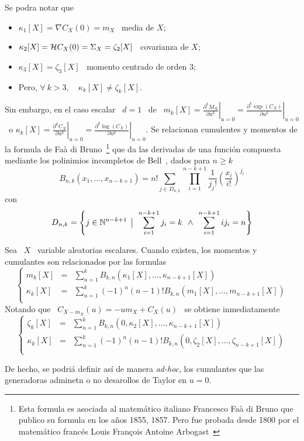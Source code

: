 {Se podra notar que
%
\begin{itemize}
\item $\kappa_1[X] = \nabla C_X(0) = m_X$ \ media de $X$;
%
\item $\kappa_2[X] = \mathcal{H} C_X(0) = \Sigma_X = \zeta_2[X]$ \ covarianza de $X$;
%
\item $\kappa_3[X] = \zeta_3[X]$ \ momento centrado de orden 3;
%
\item Pero, $\forall \: k > 3, \quad \kappa_k[X] \ne \zeta_k[X]$.
\end{itemize}

Sin embargo, en  el caso escalar \  $d=1$ \ de \ $m_k[X]  = \left. \frac{\partial^k
    M_X}{\partial     u^k}    \right|_{u=0}    =     \left.     \frac{\partial^k
    \exp(C_X)}{\partial   u^k}   \right|_{u=0}$   \   o   $\kappa_k[X]   =   \left.
  \frac{\partial^k C_X}{\partial  u^k} \right|_{u=0} =  \left.  \frac{\partial^k
    \log(C_X)}{\partial u^k} \right|_{u=0}$. Se relacionan cumulentes y momentos
de  la  formula  de  Fa\`a   di  Bruno~\footnote{Esta  formula  es  asociada  al
  matem\'atico italiano Francesco  Fa\`a di Bruno que publico  su formula en los
  a\~nos 1855, 1857.  Pero fue  probada desde 1800 por el matem\'atico franc\'es
  Louis Fran\c{c}ois Antoine Arbogast~\cite{Abo00}}  que da las derivadas de una
funci\'on compuesta~\cite{Faa55,  Faa57} mediante los  polinimios incompletos de
Bell~\cite{Bel27}, dados para $n \ge k$
%
\[
B_{n,k}(x_1,\ldots,x_{n-k+1})  = n!   \sum_{j  \in D_{n,k}}  \prod_{i=1}^{n-k+1}
\frac{1}{j_j!} \left( \frac{x_i}{i!} \right)^{j_i}
\]
%
con
%
\[
D_{n,k}  =  \left\{ j  \in  \mathbb{N}^{n-k+1} \:\: \big| \:\:  \sum_{i=1}^{n-k+1}  j_i  = k  \:\: \wedge \:\:
  \sum_{i=1}^{n-k+1} i j_i = n \right\}
\]

\begin{lema}
  Sea  \ $X$ \  variable aleatorias  escalares. Cuando  existen, los  momentos y
  cumulantes son relacionados por las formulas
%
\[\left\{\begin{array}{lll}
m_k[X] & = & \displaystyle \sum_{n=1}^k B_{k,n}( \kappa_1[X] , \ldots , \kappa_{n-k+1}[X]) \\[2mm]
%
\kappa_k[X] & = & \displaystyle \sum_{n=1}^k (-1)^n (n-1)! B_{k,n}( m_1[X] , \ldots , m_{n-k+1}[X]) \\[2mm]
\end{array}\right.\]
%
Notando que \ $C_{X-m_X}(u) = -u m_X + C_X(u)$ \ se obtiene inmediatamente
%
\[\left\{\begin{array}{lll}
\zeta_k[X] & = & \displaystyle \sum_{n=1}^k B_{k,n}( 0 , \kappa_2[X] , \ldots , \kappa_{n-k+1}[X]) \\[2mm]
%
\kappa_k[X] & = & \displaystyle \sum_{n=1}^k (-1)^n (n-1)! B_{k,n}( 0 , \zeta_2[X] , \ldots , \zeta_{n-k+1}[X]) \\[2mm]
\end{array}\right.\]
\end{lema}
%
De hecho,  se podri\'a definir as\'i  de manera {\em ad-hoc},  los cumulantes que
las generadoras adminetn o no desarollos de Taylor en $u = 0$.

}
